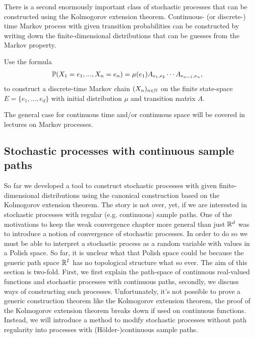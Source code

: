 There is a second enormously important class of stochastic processes that can be constructed using the Kolmogorov extension theorem. Continuous- (or discrete-) time Markov process with given transition probabilities can be constructed by writing down the finite-dimensional distributions that can be guesses from the Markov property. 
\begin{luebung}
	Use the formula
	\begin{align*}
		\P(X_{1}=e_1,...,X_{n}=e_n)=\mu(e_1)A_{e_1,e_2}\cdots A_{e_{n-1},e_n},
	\end{align*}
	to construct a discrete-time Markov chain $(X_n)_{n\in\N}$ on the finite state-space $E=\{e_1,...,e_d\}$ with initial distribution $\mu$ and transition matrix $A$.
\end{luebung}
The general case for continuous time and/or continuous space will be covered in lectures on Markov processes.


\subsection{Stochastic processes with continuous sample paths}\label{sec:continuouspaths}

So far we developed a tool to construct stochastic processes with given finite-dimensional distributions using the canonical construction based on the Kolmogorov extension theorem. The story is not over, yet, if we are interested in stochastic processes with regular (e.g. continuous) sample paths. One of the motivations to keep the weak convergence chapter more general than just $\R^d$ was to introduce a notion of convergence of stochastic processes. In order to do so we must be able to interpret a stochastic process as a random variable with values in a Polish space. So far, it is unclear what that Polish space could be because the generic path space $\R^{I}$ has no topological structure what so ever. The aim of this section is two-fold. First, we first explain the path-space of continuous real-valued functions and stochastic processes with continuous paths, secondly, we discuss ways of constructing such processes. Unfortunately, it's not possible to prove a generic construction theorem like the Kolmogorov extension theorem, the proof of the Kolmogorov extension theorem breaks down if used on continuous functions. Instead, we will introduce a method to modify stochastic processes without path regularity into processes with (H\"older-)continuous sample paths. 

